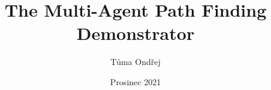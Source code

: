 \worktype [O/EN]
\title {The Multi-Agent Path Finding Demonstrator}
\author {Tůma Ondřej}
\supervisor {\kulich}
\date {Prosinec 2021}
